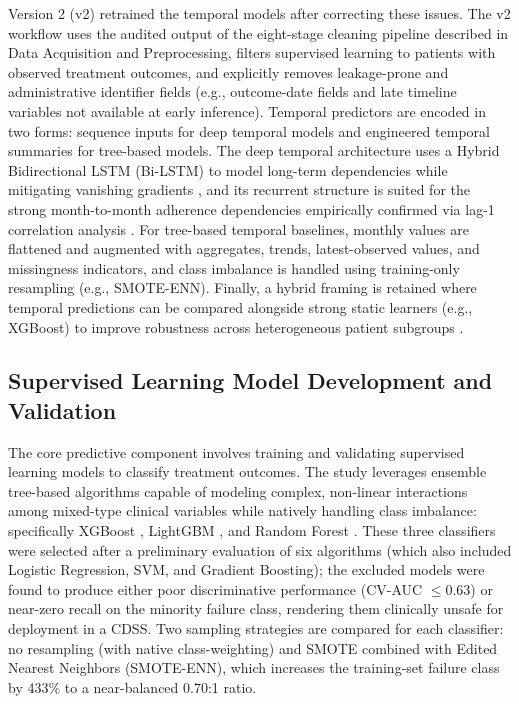 \documentclass[12pt]{article}
\begin{document}
Version 2 (v2) retrained the temporal models after correcting these issues. The v2 workflow uses the audited output of the eight-stage cleaning pipeline described in Data Acquisition and Preprocessing, filters supervised learning to patients with observed treatment outcomes, and explicitly removes leakage-prone and administrative identifier fields (e.g., outcome-date fields and late timeline variables not available at early inference). Temporal predictors are encoded in two forms: sequence inputs for deep temporal models and engineered temporal summaries for tree-based models. The deep temporal architecture uses a Hybrid Bidirectional LSTM (Bi-LSTM) to model long-term dependencies while mitigating vanishing gradients \citep{ref11}, and its recurrent structure is suited for the strong month-to-month adherence dependencies empirically confirmed via lag-1 correlation analysis \citep{ref12}. For tree-based temporal baselines, monthly values are flattened and augmented with aggregates, trends, latest-observed values, and missingness indicators, and class imbalance is handled using training-only resampling (e.g., SMOTE-ENN). Finally, a hybrid framing is retained where temporal predictions can be compared alongside strong static learners (e.g., XGBoost) to improve robustness across heterogeneous patient subgroups \citep{ref10}.

\subsection{Supervised Learning Model Development and Validation}

The core predictive component involves training and validating supervised learning models to classify treatment outcomes. The study leverages ensemble tree-based algorithms capable of modeling complex, non-linear interactions among mixed-type clinical variables while natively handling class imbalance: specifically XGBoost \citep{chen2016xgboost,ref16}, LightGBM \citep{ke2017lightgbm}, and Random Forest \citep{breiman2001random}. These three classifiers were selected after a preliminary evaluation of six algorithms (which also included Logistic Regression, SVM, and Gradient Boosting); the excluded models were found to produce either poor discriminative performance (CV-AUC $\leq 0.63$) or near-zero recall on the minority failure class, rendering them clinically unsafe for deployment in a CDSS. Two sampling strategies are compared for each classifier: no resampling (with native class-weighting) and SMOTE combined with Edited Nearest Neighbors (SMOTE-ENN), which increases the training-set failure class by 433\% to a near-balanced 0.70:1 ratio.
\end{document}
